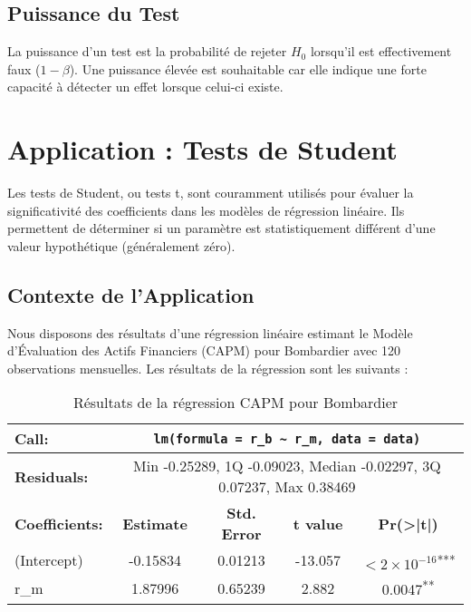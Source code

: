\documentclass[14pt]{extarticle} %
\theoremstyle{definition}
\theoremstyle{plain}
\begin{document}
\subsection{Puissance du Test}

La puissance d'un test est la probabilité de rejeter \(H_0\) lorsqu'il est effectivement faux (\(1 - \beta\)). Une puissance élevée est souhaitable car elle indique une forte capacité à détecter un effet lorsque celui-ci existe.

\section{Application : Tests de Student}

Les tests de Student, ou tests t, sont couramment utilisés pour évaluer la significativité des coefficients dans les modèles de régression linéaire. Ils permettent de déterminer si un paramètre est statistiquement différent d'une valeur hypothétique (généralement zéro).

\subsection{Contexte de l'Application}

Nous disposons des résultats d'une régression linéaire estimant le Modèle d'Évaluation des Actifs Financiers (CAPM) pour Bombardier avec 120 observations mensuelles. Les résultats de la régression sont les suivants :

\begin{landscape}
\begin{table}[h!]
    \centering
    \begin{tabular}{lcccc}
        \toprule
        \textbf{Call:} & \multicolumn{4}{c}{\texttt{lm(formula = r\_b \textasciitilde{} r\_m, data = data)}} \\
        \midrule
        \textbf{Residuals:} & \multicolumn{4}{c}{Min -0.25289, 1Q -0.09023, Median -0.02297, 3Q 0.07237, Max 0.38469} \\
        \midrule
        \textbf{Coefficients:} & \textbf{Estimate} & \textbf{Std. Error} & \textbf{t value} & \textbf{Pr(>|t|)} \\
        \midrule
        (Intercept) & -0.15834 & 0.01213 & -13.057 & $<2\times10^{-16}$\textsuperscript{***} \\
        r\_m & 1.87996 & 0.65239 & 2.882 & 0.0047\textsuperscript{**} \\
        \bottomrule
    \end{tabular}
    \caption{Résultats de la régression CAPM pour Bombardier}
\end{table}
\end{landscape}
\end{document}
